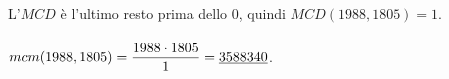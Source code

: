 \documentclass[a4paper]{report}
\begin{document}
        \paragraph{}
        L'$MCD$ \`{e} l'ultimo resto prima dello $0$, quindi $MCD(1988, 1805) = 1$.

        \paragraph{}
        $mcm(1988, 1805) = \mathlarger{\frac{1988 \cdot 1805}{1}} = \underline{3588340}$.
\end{document}
